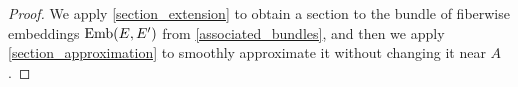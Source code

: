 \documentclass[11pt]{amsart}
\theoremstyle{definition}
\numberwithin{equation}{section}
\numberwithin{figure}{section}
\newcommand{\Emb}{\textup{Emb}}
\begin{document}
\begin{proof}
We  apply \autoref{section_extension} to obtain a section to the bundle of fiberwise embeddings $\Emb(E,E')$ from \autoref{associated_bundles}, and then we  apply  \autoref{section_approximation} to smoothly approximate it without changing it near $A$.
%
%	
%	
%
\end{proof}
\end{document}
